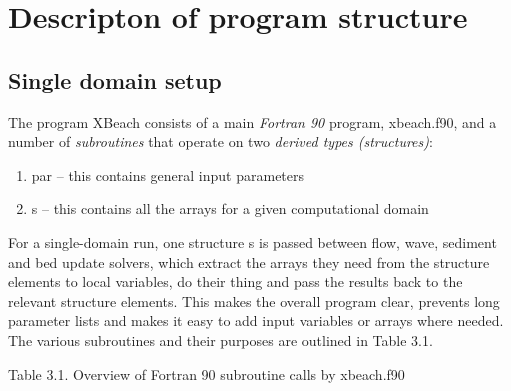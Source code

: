 \chapter{ Descripton of program structure}
\section{ Single domain setup}

The program XBeach consists of a main \textit{Fortran 90} program, xbeach.f90, and a number of \textit{subroutines} that operate on two \textit{derived types (structures)}:

\begin{enumerate}
\item  par -- this contains general input parameters

\item  s     -- this contains all the arrays for a given computational domain
\end{enumerate}

For a single-domain run, one structure s is passed between flow, wave, sediment and bed update solvers, which extract the arrays they need from the structure elements to local variables, do their thing and pass the results back to the relevant structure elements. This makes the overall program clear, prevents long parameter lists and makes it easy to add input variables or arrays where needed. The various subroutines and their purposes are outlined in Table 3.1.

Table 3.1. Overview of Fortran 90 subroutine calls by xbeach.f90

